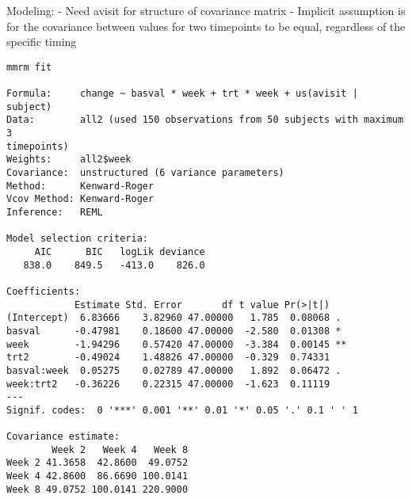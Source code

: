 \documentclass[
  letterpaper,
  DIV=11,
  numbers=noendperiod]{scrreprt}
\newenvironment{Shaded}{\begin{snugshade}}{\end{snugshade}}
\newcommand{\AttributeTok}[1]{\textcolor[rgb]{0.40,0.45,0.13}{#1}}
\newcommand{\FunctionTok}[1]{\textcolor[rgb]{0.28,0.35,0.67}{#1}}
\newcommand{\NormalTok}[1]{\textcolor[rgb]{0.00,0.23,0.31}{#1}}
\newcommand{\OtherTok}[1]{\textcolor[rgb]{0.00,0.23,0.31}{#1}}
\newcommand{\SpecialCharTok}[1]{\textcolor[rgb]{0.37,0.37,0.37}{#1}}
\newcommand{\StringTok}[1]{\textcolor[rgb]{0.13,0.47,0.30}{#1}}
\begin{document}
Modeling: - Need avisit for structure of covariance matrix - Implicit
assumption is for the covariance between values for two timepoints to be
equal, regardless of the specific timing

\begin{Shaded}
\end{Shaded}

\begin{verbatim}
mmrm fit

Formula:     change ~ basval * week + trt * week + us(avisit | subject)
Data:        all2 (used 150 observations from 50 subjects with maximum 3 
timepoints)
Weights:     all2$week
Covariance:  unstructured (6 variance parameters)
Method:      Kenward-Roger
Vcov Method: Kenward-Roger
Inference:   REML

Model selection criteria:
     AIC      BIC   logLik deviance 
   838.0    849.5   -413.0    826.0 

Coefficients: 
            Estimate Std. Error       df t value Pr(>|t|)   
(Intercept)  6.83666    3.82960 47.00000   1.785  0.08068 . 
basval      -0.47981    0.18600 47.00000  -2.580  0.01308 * 
week        -1.94296    0.57420 47.00000  -3.384  0.00145 **
trt2        -0.49024    1.48826 47.00000  -0.329  0.74331   
basval:week  0.05275    0.02789 47.00000   1.892  0.06472 . 
week:trt2   -0.36226    0.22315 47.00000  -1.623  0.11119   
---
Signif. codes:  0 '***' 0.001 '**' 0.01 '*' 0.05 '.' 0.1 ' ' 1

Covariance estimate:
        Week 2   Week 4   Week 8
Week 2 41.3658  42.8600  49.0752
Week 4 42.8600  86.6690 100.0141
Week 8 49.0752 100.0141 220.9000
\end{verbatim}
\end{document}

